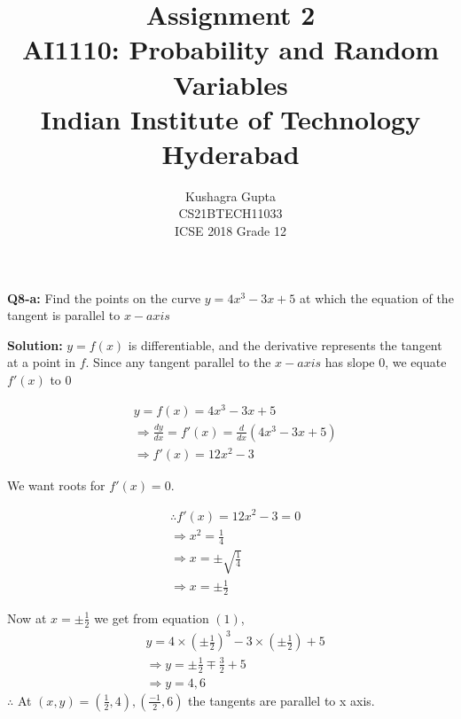 \documentclass[journal,12pt,twocolumn]{IEEEtran}
\begin{document}
\graphicspath{{figures/}}

\title{Assignment 2 \\ \Large AI1110: Probability and Random Variables \\ \large Indian Institute of Technology Hyderabad}
\author{Kushagra Gupta \\ \normalsize CS21BTECH11033  \\ \Large ICSE 2018 Grade 12}
\date{}
\maketitle
\begin{flushleft}
\textbf{Q8-a:}
Find the points on the curve $y = 4x^3 - 3x + 5$ at which the equation of the tangent is parallel to $x-axis$

\textbf{Solution: }$y = f(x)$ is differentiable, and the derivative represents the tangent at a point in $f$. Since any tangent parallel to the $x-axis$ has slope $0$, we equate $f'(x)$ to $0$

\begin{align}
    &y = f(x) = 4x^3 - 3x + 5\\
    &\Rightarrow \frac{dy}{dx} = f'(x) = \frac{d}{dx}(4x^3 - 3x + 5) \\
    &\Rightarrow f'(x) = 12x^2 - 3 
\end{align} 

We want roots for $f'(x) = 0$.

\begin{align}
    &\therefore f'(x) = 12x^2 - 3 = 0 \\
    &\Rightarrow x^2 = \frac{1}{4}\\
    &\Rightarrow x = \pm \sqrt{\frac{1}{4}}\\
    &\Rightarrow x = \pm \frac{1}{2} 
\end{align}

Now at $ x = \pm \frac{1}{2}$ we get from equation $(1)$,
\begin{align}
    &y =  4 \times\left(\pm\frac{1}{2}\right)^3 - 3\times\left(\pm\frac{1}{2}\right) + 5\\
    &\Rightarrow y = \pm\frac{1}{2} \mp\frac{3}{2} + 5\\
    &\Rightarrow y = 4 , 6
\end{align}
$\therefore$ At  $(x,y) = \left(\frac{1}{2},4\right) , \left(\frac{-1}{2},6\right)$ the tangents are parallel to x axis.\\


\end{flushleft}
\end{document}
